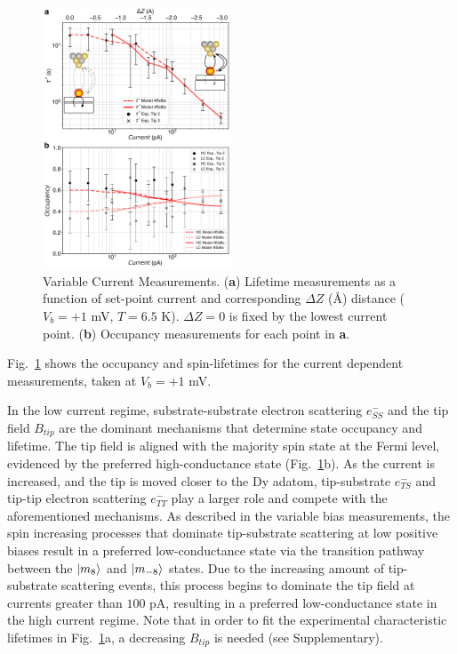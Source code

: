 \documentclass[
reprint,amsmath,amssymb,aps]{revtex4-2}
\begin{document}
\begin{figure}[h!]
\includegraphics[width=0.5\textwidth]{Fig5_new.pdf}
\caption{Variable Current Measurements. (\textbf{a}) Lifetime measurements as a function of set-point current and corresponding $\Delta Z$ (\AA) distance ($V_{b} = +1$ mV, $T = 6.5$ K). $\Delta Z = 0$ is fixed by the lowest current point. (\textbf{b}) Occupancy measurements for each point in \textbf{a}.
\label{fig:current} }
\end{figure}

Fig.~\ref{fig:current} shows the occupancy and spin-lifetimes for the current dependent measurements, taken at $V_{b} = +1$ mV.

In the low current regime, substrate-substrate electron scattering $e^{-}_{SS}$ and the tip field $B_{tip}$ are the dominant mechanisms that determine state occupancy and lifetime. The tip field is aligned with the majority spin state at the Fermi level, evidenced by the preferred high-conductance state (Fig.~\ref{fig:current}b). As the current is increased, and the tip is moved closer to the Dy adatom, tip-substrate $e^{-}_{TS}$ and tip-tip electron scattering $e^{-}_{TT}$ play a larger role and compete with the aforementioned mechanisms. As described in the variable bias measurements, the spin increasing processes that dominate tip-substrate scattering at low positive biases result in a preferred low-conductance state via the transition pathway between the $\ket{m_{8}}$ and $\ket{m_{-8}}$ states. Due to the increasing amount of tip-substrate scattering events, this process begins to dominate the tip field at currents greater than $100$ pA, resulting in a preferred low-conductance state in the high current regime. Note that in order to fit the experimental characteristic lifetimes in Fig.~\ref{fig:current}a, a decreasing $B_{tip}$ is needed (see Supplementary).



\end{document}
